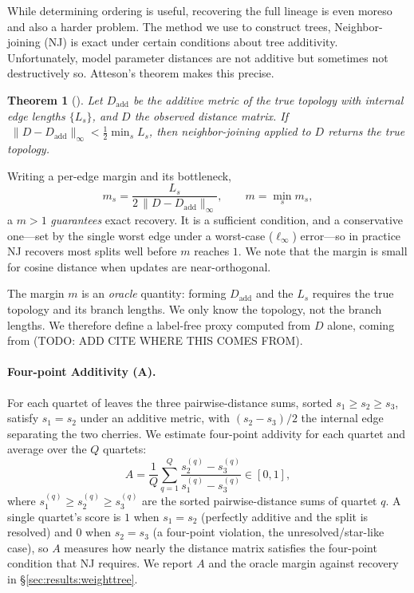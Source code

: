 \documentclass{article}
\newtheorem{theorem}{Theorem}
\theoremstyle{definition}
\theoremstyle{plain}
\begin{document}
While determining ordering is useful, recovering the full lineage is even moreso and also a harder problem. The method we use to construct trees, Neighbor-joining (NJ) is exact under certain conditions about tree additivity. Unfortunately, model parameter distances are not additive but sometimes not destructively so. Atteson's theorem makes this precise.
\begin{theorem}[\citealp{atteson1999performance}]\label{thm:atteson}
Let $D_{\mathrm{add}}$ be the additive metric of the true topology with internal edge lengths
$\{L_s\}$, and $D$ the observed distance matrix. If
$\;\lVert D-D_{\mathrm{add}}\rVert_\infty < \tfrac12\min_s L_s$, then neighbor-joining applied to $D$
returns the true topology.
\end{theorem}
Writing a per-edge margin and its bottleneck,
\[
  m_s = \frac{L_s}{2\,\lVert D-D_{\mathrm{add}}\rVert_\infty},
  \qquad
  m = \min_s m_s,
\]
a $m>1$ \emph{guarantees} exact recovery. It is a sufficient condition, and a conservative
one---set by the single worst edge under a worst-case ($\ell_\infty$) error---so in practice NJ recovers
most splits well before $m$ reaches $1$. We note that the margin is small for cosine distance when updates are near-orthogonal.

The margin $m$ is an \emph{oracle} quantity: forming $D_{\mathrm{add}}$ and the $L_s$ requires the true
topology and its branch lengths. We only know the topology, not the branch lengths.  We therefore define a label-free proxy computed from $D$ alone, coming from (TODO: ADD CITE WHERE THIS COMES FROM).

\paragraph{Four-point Additivity (A).}For each quartet of leaves the three pairwise-distance sums, sorted $s_1\ge s_2\ge s_3$, satisfy
$s_1=s_2$ under an additive metric, with $(s_2-s_3)/2$ the internal edge separating the two cherries.
We estimate four-point addivity for each quartet and average over the $Q$ quartets:
\[
  A=\frac{1}{Q}\sum_{q=1}^{Q}\frac{s_2^{(q)}-s_3^{(q)}}{s_1^{(q)}-s_3^{(q)}}\in[0,1] ,
\]
where $s_1^{(q)}\ge s_2^{(q)}\ge s_3^{(q)}$ are the sorted pairwise-distance sums of quartet $q$.
A single quartet's score is $1$ when $s_1=s_2$ (perfectly additive and the split is resolved) and $0$
when $s_2=s_3$ (a four-point violation, the unresolved/star-like case), so $A$ measures how nearly the
distance matrix satisfies the four-point condition that NJ requires. We report $A$ and the
oracle margin against recovery in \S\ref{sec:results:weighttree}.
\end{document}
